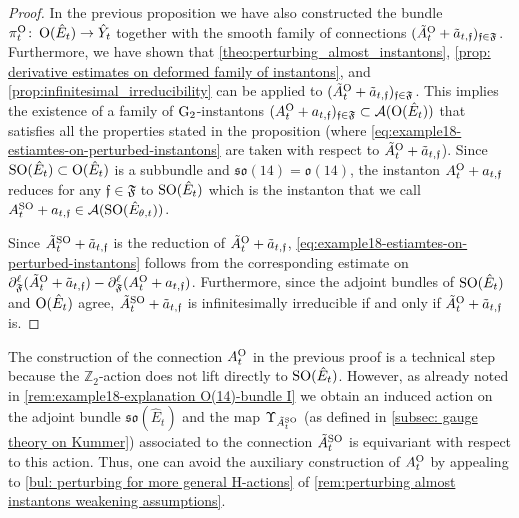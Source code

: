 \documentclass[11pt,a4paper]{scrartcl}
\newcommand{\col}{\colon \thinspace}
\newcommand{\G}{\textup{G}}
\newcommand{\SO}{\textup{SO}}
\renewcommand{\O}{\textup{O}}
\numberwithin{equation}{section}
\theoremstyle{plain}
\theoremstyle{definition}
\theoremstyle{remark}
\begin{document}
\begin{proof}
In the previous proposition we have also constructed the bundle $\pi_t^\O \col \O(\hat{E}_t) \to \hat{Y}_t$ together with the smooth family of connections $(\tilde{A}_t^\O+\tilde{a}_{t,\mathfrak{f}})_{\mathfrak{f}\in \mathfrak{F}}$. Furthermore, we have shown that \autoref{theo:perturbing_almost_instantons}, \autoref{prop: derivative estimates on deformed family of instantons}, and \autoref{prop:infinitesimal_irreducibility} can be applied to $(\tilde{A}_t^\O+\tilde{a}_{t,\mathfrak{f}})_{\mathfrak{f}\in \mathfrak{F}}$. This implies the existence of a family of $\G_2$-instantons $(A_{t}^\O+a_{t,\mathfrak{f}})_{\mathfrak{f}\in \mathfrak{F}} \subset \mathcal{A}(\O(\hat{E}_t))$ that satisfies all the properties stated in the proposition (where \eqref{eq:example18-estiamtes-on-perturbed-instantons} are taken with respect to $\tilde{A}_t^\O+\tilde{a}_{t,\mathfrak{f}}$). Since $\SO(\hat{E}_{t}) \subset \O(\hat{E}_{t})$ is a subbundle and $\mathfrak{so}(14)=\mathfrak{o}(14)$, the instanton $A_{t}^\O + a_{t,\mathfrak{f}}$ reduces for any $\mathfrak{f}\in \mathfrak{F}$ to $\SO(\hat{E}_{t})$ which is the instanton that we call $A_{t}^\SO + a_{t,\mathfrak{f}} \in \mathcal{A}(\SO(\hat{E}_{\theta,t}))$. 

Since $\tilde{A}_t^{\SO} + \tilde{a}_{t,\mathfrak{f}}$ is the reduction of $\tilde{A}_t^\O + \tilde{a}_{t,\mathfrak{f}}$, \eqref{eq:example18-estiamtes-on-perturbed-instantons} follows from the corresponding estimate on $\partial_\mathfrak{F}^{\ell}(\tilde{A}_{t}^{\O} + \tilde{a}_{t,\mathfrak{f}}) -\partial_\mathfrak{F}^\ell (A_{t}^\O + a_{t,\mathfrak{f}})$. Furthermore, since the adjoint bundles of $\SO(\hat{E}_t)$ and $\O(\hat{E}_t)$ agree, $\tilde{A}_{t}^{\SO} + \tilde{a}_{t,\mathfrak{f}}$ is infinitesimally irreducible if and only if $\tilde{A}_{t}^{\O} + \tilde{a}_{t,\mathfrak{f}}$ is.
\end{proof}

\begin{remark}
The construction of the connection $A^\O_{t}$ in the previous proof is a technical step because the $\mathbb{Z}_2$-action does not lift directly to $\SO(\hat{E}_{t})$. However, as already noted in \autoref{rem:example18-explanation O(14)-bundle I} we obtain an induced action on the adjoint bundle $\mathfrak{so}(\hat{E}_{t})$ and the map $\Upsilon_{\tilde{A}^{\SO}_{t}}$ (as defined in \autoref{subsec: gauge theory on Kummer}) associated to the connection $\tilde{A}^{\SO}_{t}$ is equivariant with respect to this action. Thus, one can avoid the auxiliary construction of $A^\O_{t}$ by appealing to \autoref{bul: perturbing for more general H-actions} of \autoref{rem:perturbing almost instantons weakening assumptions}.
\end{remark}
\end{document}
